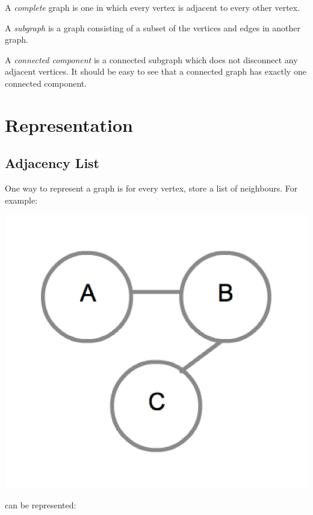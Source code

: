 A \emph{complete} graph is one in which every vertex is adjacent to
every other vertex.

A \emph{subgraph} is a graph consisting of a subset of the vertices
and edges in another graph.

A \emph{connected component} is a connected subgraph which does
not disconnect any adjacent vertices.  It should be easy to see that a
connected graph has exactly one connected component.

\section{Representation}

\subsection{Adjacency List}

One way to represent a graph is for every vertex, store a list of
neighbours.  For example:

{
  \includegraphics[scale=0.2]{SimpleGraph}
  \label{fig:SimpleGraph}
}

can be represented:

